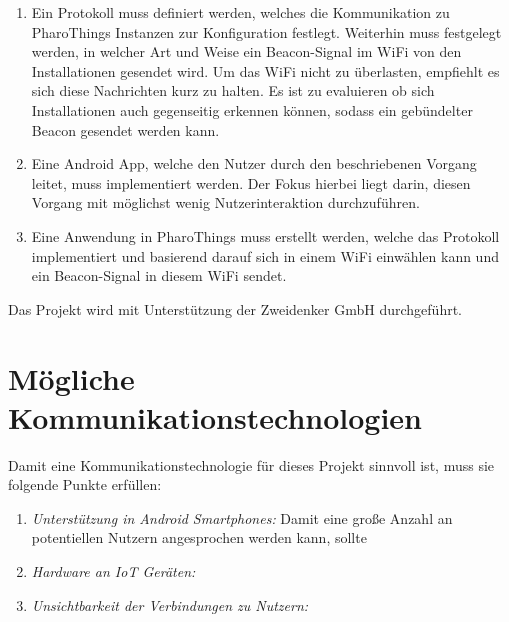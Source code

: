 \documentclass[12pt,a4paper]{article}
\begin{document}
        \begin{enumerate}
            \item Ein Protokoll muss definiert werden, welches die Kommunikation zu PharoThings Instanzen zur Konfiguration festlegt. Weiterhin muss festgelegt werden, in welcher Art und Weise ein Beacon-Signal im WiFi von den Installationen gesendet wird. Um das WiFi nicht zu überlasten, empfiehlt es sich diese Nachrichten kurz zu halten. Es ist zu evaluieren ob sich Installationen auch gegenseitig erkennen können, sodass ein gebündelter Beacon gesendet werden kann.
            \item Eine Android App, welche den Nutzer durch den beschriebenen Vorgang leitet, muss implementiert werden. Der Fokus hierbei liegt darin, diesen Vorgang mit möglichst wenig Nutzerinteraktion durchzuführen.
            \item Eine Anwendung in PharoThings muss erstellt werden, welche das Protokoll implementiert und basierend darauf sich in einem WiFi einwählen kann und ein Beacon-Signal in diesem WiFi sendet.
        \end{enumerate}
        Das Projekt wird mit Unterstützung der Zweidenker GmbH durchgeführt.
    \pagebreak
    \section{Mögliche Kommunikationstechnologien}
        Damit eine Kommunikationstechnologie für dieses Projekt sinnvoll ist, muss sie folgende Punkte erfüllen:
        \begin {enumerate}
        \item {\it Unterstützung in Android Smartphones:}
        Damit eine große Anzahl an potentiellen Nutzern angesprochen werden kann, sollte
        \item {\it Hardware an IoT Geräten:}
        \item {\it Unsichtbarkeit der Verbindungen zu Nutzern:}
        \end {enumerate}
\end{document}
